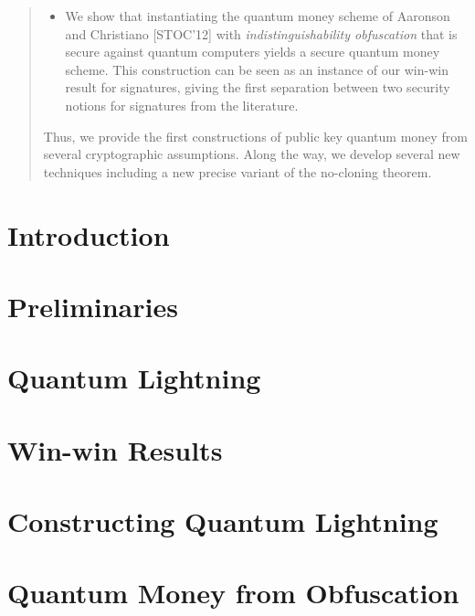 \documentclass[letterpaper,11pt]{article}
\begin{document}
\begin{abstract}
\begin{itemize}
	\item We show that instantiating the quantum money scheme of Aaronson and Christiano [STOC'12] with \emph{indistinguishability obfuscation} that is secure against quantum computers yields a secure quantum money scheme.  This construction can be seen as an instance of our win-win result for signatures, giving the first separation between two security notions for signatures from the literature.  
\end{itemize}

Thus, we provide the first constructions of public key quantum money from several cryptographic assumptions.  Along the way, we develop several new techniques including a new precise variant of the no-cloning theorem.
\end{abstract}

\clearpage
\setcounter{page}{1}

\section{Introduction}



\section{Preliminaries}



\section{Quantum Lightning}



\section{Win-win Results}



\section{Constructing Quantum Lightning}



\section{Quantum Money from Obfuscation}






\appendix
\end{document}
